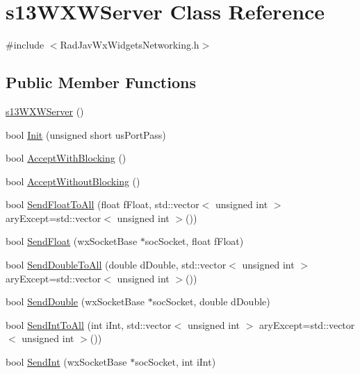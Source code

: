 \hypertarget{classs13_w_x_w_server}{}\section{s13\+W\+X\+W\+Server Class Reference}
\label{classs13_w_x_w_server}


{\ttfamily \#include $<$Rad\+Jav\+Wx\+Widgets\+Networking.\+h$>$}

\subsection*{Public Member Functions}
\begin{DoxyCompactItemize}
\item 
\hyperlink{classs13_w_x_w_server_ac85832a4c5d3eaa8a55492aad3e07af2}{s13\+W\+X\+W\+Server} ()
\item 
bool \hyperlink{classs13_w_x_w_server_a27c7e5cc0d37daa7914c8172f9706953}{Init} (unsigned short us\+Port\+Pass)
\item 
bool \hyperlink{classs13_w_x_w_server_a10bc70f40b42e4f2b924e28fb241e6a1}{Accept\+With\+Blocking} ()
\item 
bool \hyperlink{classs13_w_x_w_server_ac0de5deb9578a2608ec2aa614863a17d}{Accept\+Without\+Blocking} ()
\item 
bool \hyperlink{classs13_w_x_w_server_a1f2d1e8d94824ffe88997a1645f4afb3}{Send\+Float\+To\+All} (float f\+Float, std\+::vector$<$ unsigned int $>$ ary\+Except=std\+::vector$<$ unsigned int $>$())
\item 
bool \hyperlink{classs13_w_x_w_server_a8e740f4116d40616aa9cadc1a316a68a}{Send\+Float} (wx\+Socket\+Base $\ast$soc\+Socket, float f\+Float)
\item 
bool \hyperlink{classs13_w_x_w_server_a613f9303e79b52584cdff55b520677af}{Send\+Double\+To\+All} (double d\+Double, std\+::vector$<$ unsigned int $>$ ary\+Except=std\+::vector$<$ unsigned int $>$())
\item 
bool \hyperlink{classs13_w_x_w_server_a1fb2498a75281cc79650df6b7d800f26}{Send\+Double} (wx\+Socket\+Base $\ast$soc\+Socket, double d\+Double)
\item 
bool \hyperlink{classs13_w_x_w_server_ad6171d8604d7016081c1dadeaacde981}{Send\+Int\+To\+All} (int i\+Int, std\+::vector$<$ unsigned int $>$ ary\+Except=std\+::vector$<$ unsigned int $>$())
\item 
bool \hyperlink{classs13_w_x_w_server_a9344df57e41b0140b4cf42bf4142d9ef}{Send\+Int} (wx\+Socket\+Base $\ast$soc\+Socket, int i\+Int)

\end{DoxyCompactItemize}
